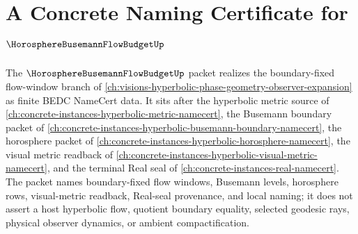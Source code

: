 \chapter{A Concrete Naming Certificate for $\HorosphereBusemannFlowBudgetUp$}
\label{ch:concrete-instances-horosphere-busemann-flow-budget-namecert}

The $\HorosphereBusemannFlowBudgetUp$ packet realizes the boundary-fixed flow-window branch of \autoref{ch:visions-hyperbolic-phase-geometry-observer-expansion} as finite BEDC NameCert data. It sits after the hyperbolic metric source of \autoref{ch:concrete-instances-hyperbolic-metric-namecert}, the Busemann boundary packet of \autoref{ch:concrete-instances-hyperbolic-busemann-boundary-namecert}, the horosphere packet of \autoref{ch:concrete-instances-hyperbolic-horosphere-namecert}, the visual metric readback of \autoref{ch:concrete-instances-hyperbolic-visual-metric-namecert}, and the terminal Real seal of \autoref{ch:concrete-instances-real-namecert}. The packet names boundary-fixed flow windows, Busemann levels, horosphere rows, visual-metric readback, Real-seal provenance, and local naming; it does not assert a host hyperbolic flow, quotient boundary equality, selected geodesic rays, physical observer dynamics, or ambient compactification.

